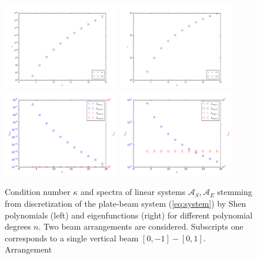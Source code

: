 \documentclass{marine_2015}
\begin{document}
 \begin{figure}[t!]
 \centering
 \includegraphics[width=0.45\textwidth]{img/shen_cond}
 \includegraphics[width=0.45\textwidth]{img/sine_cond}\\
 \includegraphics[width=0.45\textwidth]{img/shen_spectrum}
 \includegraphics[width=0.45\textwidth]{img/sine_spectrum}\\
 \caption{Condition number $\kappa$ and spectra of linear systems $\mathcal{A}_S,
 \mathcal{A}_E$ stemming from discretization of the plate-beam system
 (\ref{eq:system})
 by Shen polynomials (left) and eigenfunctions (right) for different polynomial 
 degrees $n$. Two beam arrangements are considered. Subscripts one corresponds 
 to a single vertical beam $\left[0, -1\right]-\left[0, 1\right]$. Arrangement 
}
\end{figure}
\end{document}
